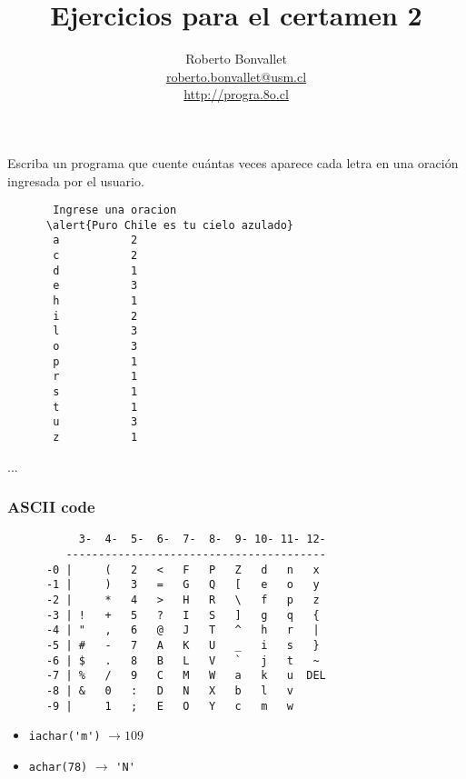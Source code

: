 \documentclass[10pt]{beamer}
\title{Ejercicios para el certamen 2}
\author{
  Roberto Bonvallet \\
  \url{roberto.bonvallet@usm.cl} \\
  \url{http://progra.8o.cl}
}
\begin{document}
  \begin{frame}
    \maketitle
  \end{frame}

  \begin{frame}[fragile]
    Escriba un programa
    que cuente cuántas veces aparece cada letra
    en una oración ingresada por el usuario.
    \begin{Verbatim}
       Ingrese una oracion
      \alert{Puro Chile es tu cielo azulado}
       a           2
       c           2
       d           1
       e           3
       h           1
       i           2
       l           3
       o           3
       p           1
       r           1
       s           1
       t           1
       u           3
       z           1
    \end{Verbatim}

\end{frame}

  \begin{frame}
    
    ...
  \end{frame}

  \begin{frame}[fragile]
    \frametitle{ASCII code}
    \begin{verbatim}
           3-  4-  5-  6-  7-  8-  9- 10- 11- 12-
         ----------------------------------------
      -0 |     (   2   <   F   P   Z   d   n   x
      -1 |     )   3   =   G   Q   [   e   o   y
      -2 |     *   4   >   H   R   \   f   p   z
      -3 | !   +   5   ?   I   S   ]   g   q   {
      -4 | "   ,   6   @   J   T   ^   h   r   |
      -5 | #   -   7   A   K   U   _   i   s   }
      -6 | $   .   8   B   L   V   `   j   t   ~
      -7 | %   /   9   C   M   W   a   k   u  DEL
      -8 | &   0   :   D   N   X   b   l   v 
      -9 |     1   ;   E   O   Y   c   m   w 
    \end{verbatim}

    \begin{itemize}
      \item \lstinline+iachar('m')+ $\longrightarrow 109$
      \item \lstinline+achar(78)+ $\longrightarrow$ \lstinline+'N'+
    \end{itemize}

\end{frame}
\end{document}
